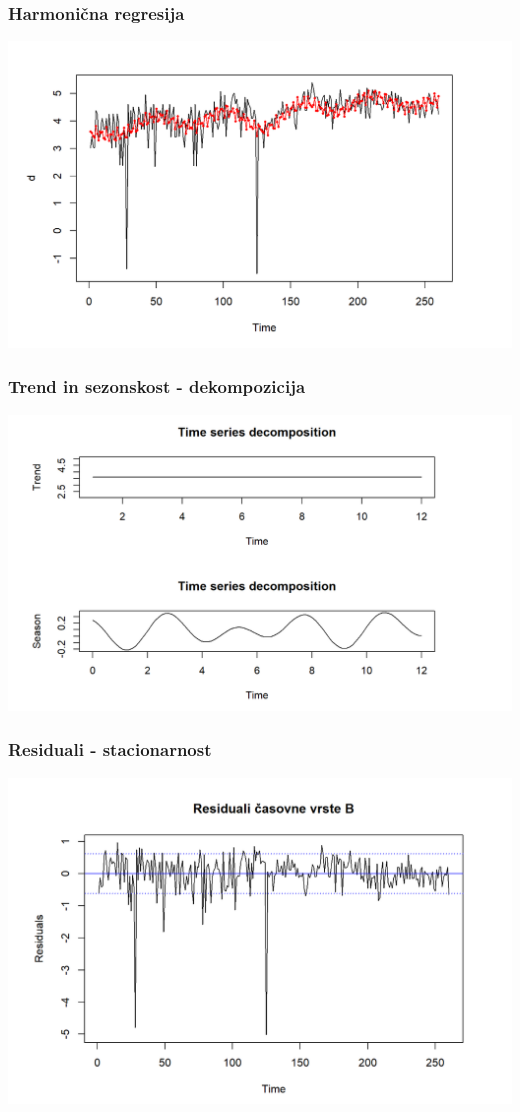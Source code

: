 \documentclass[10pt]{beamer}
\begin{document}
\begin{frame}
\frametitle{Harmonična regresija}
\includegraphics[width=1\textwidth]{fitB.png}
\end{frame}

\begin{frame}
\frametitle{Trend in sezonskost - dekompozicija}
\includegraphics[width=1\textwidth]{seasonB.png}
\end{frame}

\begin{frame}
\frametitle{Residuali - stacionarnost}
\includegraphics[width=1\textwidth]{res_log_B.png}
\end{frame}
\end{document}
